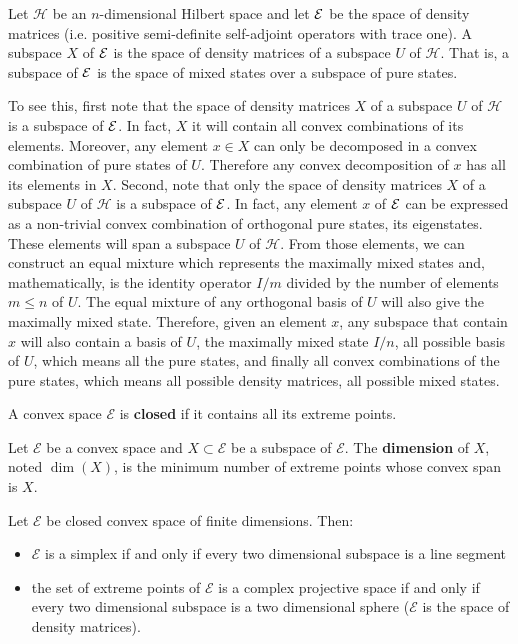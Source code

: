 \begin{example}
	Let $\mathcal{H}$ be an $n$-dimensional Hilbert space and let $\mathcal{E}$ be the space of density matrices (i.e. positive semi-definite self-adjoint operators with trace one). A subspace $X$ of $\mathcal{E}$ is the space of density matrices of a subspace $U$ of $\mathcal{H}$. That is, a subspace of $\mathcal{E}$ is the space of mixed states over a subspace of pure states.
	
	To see this, first note that the space of density matrices $X$ of a subspace $U$ of $\mathcal{H}$ is a subspace of $\mathcal{E}$. In fact, $X$ it will contain all convex combinations of its elements. Moreover, any element $x \in X$ can only be decomposed in a convex combination of pure states of $U$. Therefore any convex decomposition of $x$ has all its elements in $X$. Second, note that only the space of density matrices $X$ of a subspace $U$ of $\mathcal{H}$ is a subspace of $\mathcal{E}$. In fact, any element $x$ of $\mathcal{E}$ can be expressed as a non-trivial convex combination of orthogonal pure states, its eigenstates. These elements will span a subspace $U$ of $\mathcal{H}$. From those elements, we can construct an equal mixture which represents the maximally mixed states and, mathematically, is the identity operator $I/m$ divided by the number of elements $m \leq n$ of $U$. The equal mixture of any orthogonal basis of $U$ will also give the maximally mixed state. Therefore, given an element $x$, any subspace that contain $x$ will also contain a basis of $U$, the maximally mixed state $I/n$, all possible basis of $U$, which means all the pure states, and finally all convex combinations of the pure states, which means all possible density matrices, all possible mixed states.
\end{example}

\begin{defn}
	A convex space $\mathcal{E}$ is \textbf{closed} if it contains all its extreme points.
\end{defn}

\begin{defn}
	Let $\mathcal{E}$ be a convex space and $X \subset \mathcal{E}$ be a subspace of $\mathcal{E}$. The \textbf{dimension} of $X$, noted $\dim(X)$, is the minimum number of extreme points whose convex span is $X$.
\end{defn}

\begin{conj}
	Let $\mathcal{E}$ be closed convex space of finite dimensions. Then:
	\begin{itemize}
		\item $\mathcal{E}$ is a simplex if and only if every two dimensional subspace is a line segment
		\item the set of extreme points of $\mathcal{E}$ is a complex projective space if and only if every two dimensional subspace is a two dimensional sphere ($\mathcal{E}$ is the space of density matrices).
	\end{itemize}
\end{conj}

